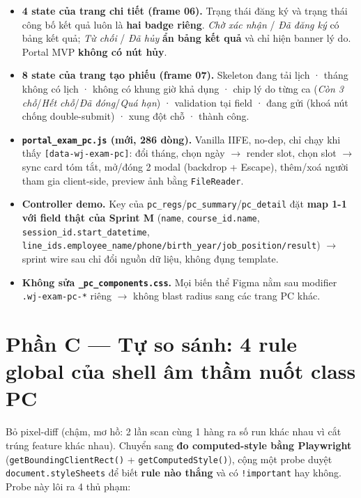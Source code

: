 \begin{itemize}
  \item \textbf{4 state của trang chi tiết (frame 06).} Trạng thái đăng ký và trạng thái công bố kết quả
    luôn là \textbf{hai badge riêng}. \emph{Chờ xác nhận} / \emph{Đã đăng ký} có bảng kết quả;
    \emph{Từ chối} / \emph{Đã hủy} \textbf{ẩn bảng kết quả} và chỉ hiện banner lý do. Portal MVP
    \textbf{không có nút hủy}.
  \item \textbf{8 state của trang tạo phiếu (frame 07).} Skeleton đang tải lịch · tháng không có lịch ·
    không có khung giờ khả dụng · chip lý do từng ca (\emph{Còn 3 chỗ}/\emph{Hết chỗ}/\emph{Đã đóng}/\emph{Quá hạn}) ·
    validation tại field · đang gửi (khoá nút chống double-submit) · xung đột chỗ · thành công.
  \item \textbf{\texttt{portal\_exam\_pc.js} (mới, 286 dòng).} Vanilla IIFE, no-dep, chỉ chạy khi thấy
    \texttt{[data-wj-exam-pc]}: đổi tháng, chọn ngày $\to$ render slot, chọn slot $\to$ sync card tóm tắt,
    mở/đóng 2 modal (backdrop + Escape), thêm/xoá người tham gia client-side, preview ảnh bằng
    \texttt{FileReader}.
  \item \textbf{Controller demo.} Key của \texttt{pc\_regs}/\texttt{pc\_summary}/\texttt{pc\_detail} đặt
    \textbf{map 1-1 với field thật của Sprint M} (\texttt{name}, \texttt{course\_id.name},
    \texttt{session\_id.start\_datetime}, \texttt{line\_ids.employee\_name/phone/birth\_year/job\_position/result})
    $\to$ sprint wire sau chỉ đổi nguồn dữ liệu, không đụng template.
  \item \textbf{Không sửa \texttt{\_pc\_components.css}.} Mọi biến thể Figma nằm sau modifier
    \texttt{.wj-exam-pc-*} riêng $\to$ không blast radius sang các trang PC khác.
\end{itemize}

\section{Phần C --- Tự so sánh: 4 rule global của shell âm thầm nuốt class PC}

Bỏ pixel-diff (chậm, mơ hồ: 2 lần scan cùng 1 hàng ra số run khác nhau vì cắt trúng feature khác nhau).
Chuyển sang \textbf{đo computed-style bằng Playwright} (\texttt{getBoundingClientRect()} +
\texttt{getComputedStyle()}), cộng một probe duyệt \texttt{document.styleSheets} để biết
\textbf{rule nào thắng} và có \texttt{!important} hay không. Probe này lôi ra 4 thủ phạm:

